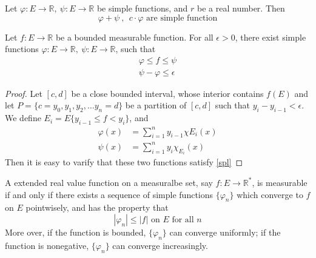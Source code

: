 \documentclass[lang=en, 12pt]{elegantbook}
\newcommand{\RR}{\mathbb{R}}
\begin{document}
                \begin{proposition}
                    Let $\varphi:E \to \RR, \ \psi:E \to \RR $ be simple functions, and $r$ be a real number. Then 
                    \begin{equation}
                            \varphi + \psi \ , \  \ c \cdot \varphi \mbox{ are simple function}
                    \end{equation}
                \end{proposition}
                \begin{lemma}
                    Let $f:E \to \RR$ be a bounded measurable function. For all $\epsilon >0$, there exist
                simple functions $\varphi:E \to \RR, \ \psi:E \to \RR$, such that 
                    \begin{equation}
                        \begin{aligned}
                            \varphi \leq f \leq \psi\\
                            \psi - \varphi \leq \epsilon 
                        \end{aligned} \label{spl}
                    \end{equation} \par
                \end{lemma}
                \begin{proof}
                    Let $[c,d]$ be a close bounded interval, whose interior contains $f(E)$ and let $P = \{c=y_0, y_1, y_2, \dots y_n=d\}$ 
                be a partition of $[c,d]$ such that $y_i-y_{i-1} < \epsilon$. We define $E_i = E\{y_{i-1}\leq f<y_i\}$, and 
                \begin{equation}
                    \begin{aligned}
                        \varphi(x) &= \sum_{i=1}^{n} y_{i-1} \chi{E_i}(x)\\
                        \psi(x) &=  \sum_{i=1}^{n} y_{i} \chi_{E_i}(x)
                    \end{aligned}
                \end{equation} 
                Then it is easy to varify that these two functions satisfy \eqref{spl}
                \end{proof}
                \begin{theorem}
                    A extended real value function on a measuralbe set, say $f:E \to \RR^*$, is measurable if and only if there exists a 
                sequence of simple functions $\{\varphi_n\}$ which converge to $f$ on $E$ pointwisely, and has the property that
                $$|\varphi_n| \leq |f| \mbox{ on $E$ for all $n$}$$
                    More over, if the function is bounded, $\{\varphi_n\}$ can converge uniformly; if the function is nonegative, $\{\varphi_n\}$
                can converge increasingly.
                \end{theorem}
\end{document}
